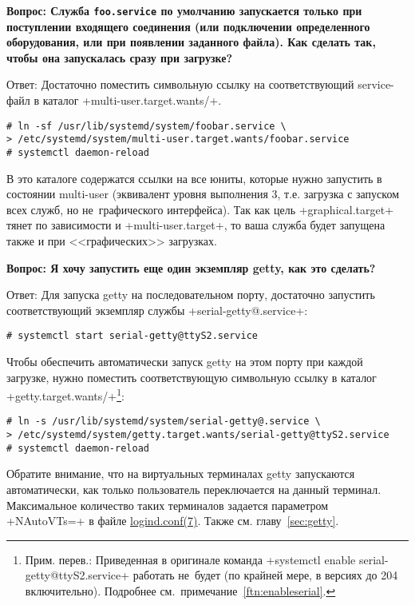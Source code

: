 \documentclass[10pt,oneside,a4paper]{article}
\newcommand{\qna}[1]{\medskip\par\textbf{Вопрос: #1}\par Ответ:}
\begin{document}
\qna{Служба \texttt{foo.service} по умолчанию запускается только при поступлении
входящего соединения (или подключении определенного оборудования, или при
появлении заданного файла). Как сделать так, чтобы она запускалась сразу при
загрузке?}
Достаточно поместить символьную ссылку на соответствующий service-файл в каталог
+multi-user.target.wants/+.
\begin{Verbatim}
# ln -sf /usr/lib/systemd/system/foobar.service \ 
> /etc/systemd/system/multi-user.target.wants/foobar.service
# systemctl daemon-reload
\end{Verbatim}

В это каталоге содержатся ссылки на все юниты, которые нужно запустить в
состоянии multi-user (эквивалент уровня выполнения 3, т.е. загрузка с запуском
всех служб, но не~графического интерфейса). Так как цель +graphical.target+
тянет по зависимости и +multi-user.target+, то ваша служба будет запущена также
и при <<графических>> загрузках.

\qna{Я хочу запустить еще один экземпляр getty, как это сделать?}
Для запуска getty на последовательном порту, достаточно запустить
соответствующий экземпляр службы +serial-getty@.service+:
\begin{Verbatim}
# systemctl start serial-getty@ttyS2.service
\end{Verbatim}

Чтобы обеспечить автоматически запуск getty на этом порту при каждой загрузке,
нужно поместить соответствующую символьную ссылку в каталог
+getty.target.wants/+\footnote{Прим. перев.: Приведенная в оригинале команда
+systemctl enable serial-getty@ttyS2.service+ работать не~будет (по крайней
мере, в версиях до 204 включительно). Подробнее 
см.~примечание~\ref{ftn:enableserial}.}:
\begin{Verbatim}
# ln -s /usr/lib/systemd/system/serial-getty@.service \
> /etc/systemd/system/getty.target.wants/serial-getty@ttyS2.service
# systemctl daemon-reload
\end{Verbatim}

Обратите внимание, что на виртуальных терминалах getty запускаются
автоматически, как только пользователь переключается на данный терминал.
Максимальное количество таких терминалов задается параметром +NAutoVTs=+ в файле
\href{http://www.freedesktop.org/software/systemd/man/logind.html}%
{logind.conf(7)}. Также см. главу~\ref{sec:getty}.
\end{document}
